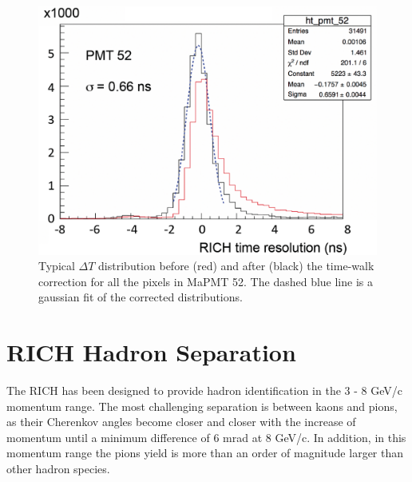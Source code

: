 \documentclass[5p,times,twocolumn]{elsarticle}
\def\MaPMT{MaPMT }
\def\dT{$\Delta T$ }
\begin{document}
\begin{figure}[t]
\begin{center}
\includegraphics[width=1.0\columnwidth]{time_walk_reso.png}
\end{center}
\caption{Typical \dT distribution before (red) and after (black) the time-walk correction for all the pixels in \MaPMT 52. The dashed blue line is a gaussian fit of the corrected distributions.}
\label{Fig:ResoTime}
\end{figure}




\section{RICH Hadron Separation}
\label{sec:HadronID}

The RICH has been designed to provide hadron identification in the 3 - 8 GeV/c momentum range. The most challenging separation is between kaons and pions, as their Cherenkov angles become closer and closer with the increase of momentum until a minimum difference of 6 mrad at 8 GeV/c. In addition, in this momentum range the pions yield is more than an order of magnitude larger than other hadron species.

\end{document}
